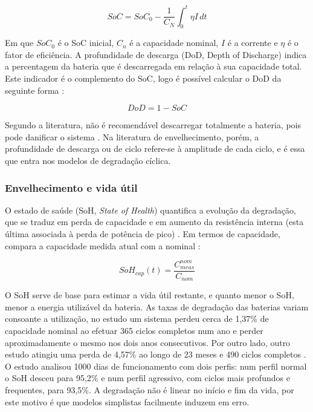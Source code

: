\[
SoC = SoC_0 - \frac{1}{C_N} \int_0^t \eta I \, dt
\]

Em que $SoC_0$ é o SoC inicial, $C_n$ é a capacidade nominal, $I$ é a corrente e $\eta$ é o fator de eficiência. 
A profundidade de descarga (DoD, Depth of Discharge) indica a percentagem da bateria que é descarregada em relação à sua capacidade total. Este indicador é o complemento do SoC, logo é possível calcular o DoD da seguinte forma \cite{ Zhao2023}:


\[
DoD = 1 - SoC
\]

Segundo a literatura, não é recomendável descarregar totalmente a bateria, pois pode danificar o sistema \cite{ Zhao2023}. Na literatura de envelhecimento, porém, a profundidade de descarga ou de ciclo refere-se à amplitude de cada ciclo, e é essa que entra nos modelos de degradação cíclica. 


\subsubsection{Envelhecimento e vida útil}
\label{sec:Ch2.1.5.3}

O estado de saúde (SoH, \textit{State of Health}) quantifica a evolução da degradação, que se traduz em perda de capacidade e em aumento da resistência interna (esta última associada à perda de potência de pico) \cite{ Shamarova2022}. Em termos de capacidade, compara a capacidade medida atual com a nominal \cite{ Hesse2017}: 


\[
SoH_{cap}(t) = \frac{C_{meas}^{nom}}{C_{nom}}
\]

O SoH serve de base para estimar a vida útil restante, e quanto menor o SoH, menor a energia utilizável da bateria. As taxas de degradação das baterias variam consoante a utilização, no estudo \cite{Andreotti2026 } um sistema perdeu cerca de 1,37\% de capacidade nominal ao efetuar 365 ciclos completos num ano e perder aproximadamente o mesmo nos dois anos consecutivos. Por outro lado, outro estudo atingiu uma perda de 4,57\% ao longo de 23 meses e 490 ciclos completos \cite{Andreotti2026 }. O estudo \cite{Rotas2026 } analisou 1000 dias de funcionamento com dois perfis: num perfil normal o SoH desceu para 95,2\% e num perfil agressivo, com ciclos mais profundos e frequentes, para 93,5\%. A degradação não é linear no início e fim da vida, por este motivo é que modelos simplistas facilmente induzem em erro. 

